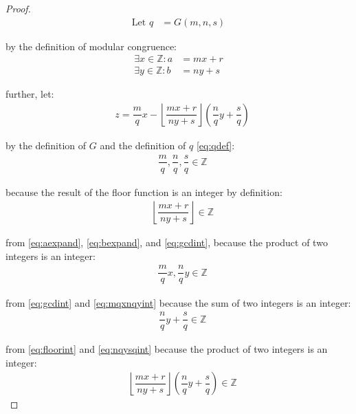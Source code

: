 \documentclass{article}
\begin{document}
\begin{proof}
\begin{align}
  \text{Let } {q} &= G\left({m}, {n}, {s}\right) \label{eq:qdef}
\end{align}

by the definition of modular congruence:
\begin{align}
  \exists {x} \in \mathbb{Z} : {a} &= {m}{x} + {r} \label{eq:aexpand} \\
  \exists {y} \in \mathbb{Z} : {b} &= {n}{y} + {s} \label{eq:bexpand}
\end{align}

further, let:
\begin{align}
  &{z} = \dfrac{{m}}{{q}}{x} - \left\lfloor\dfrac{{m}{x} + {r}}{{n}{y} + {s}}\right\rfloor\left(\dfrac{{n}}{{q}}{y} + \dfrac{{s}}{{q}}\right)
\end{align}

by the definition of $G$ and the definition of $q$ \eqref{eq:qdef}:
\begin{align}
  &\dfrac{{m}}{{q}}, \dfrac{{n}}{{q}}, \dfrac{{s}}{{q}} \in \mathbb{Z} \label{eq:gcdint}
\end{align}

because the result of the floor function is an integer by definition:
\begin{align}
  &\left\lfloor\dfrac{{m}{x} + {r}}{{n}{y} + {s}}\right\rfloor \in \mathbb{Z} \label{eq:floorint}
\end{align}

from \eqref{eq:aexpand}, \eqref{eq:bexpand}, and \eqref{eq:gcdint}, because the product of two integers is an integer:
\begin{align}
  &\dfrac{{m}}{{q}}{x}, \dfrac{{n}}{{q}}{y} \in \mathbb{Z} \label{eq:mqxnqyint}
\end{align}

from \eqref{eq:gcdint} and \eqref{eq:mqxnqyint} because the sum of two integers is an integer:
\begin{align}
  &\dfrac{{n}}{{q}}{y} + \dfrac{{s}}{{q}} \in \mathbb{Z} \label{eq:nqysqint}
\end{align}

from \eqref{eq:floorint} and \eqref{eq:nqysqint} because the product of two integers is an integer:
\begin{align}
  &\left\lfloor\dfrac{{m}{x} + {r}}{{n}{y} + {s}}\right\rfloor\left(\dfrac{{n}}{{q}}{y} + \dfrac{{s}}{{q}}\right) \in \mathbb{Z} \label{eq:prodint}
\end{align}


\end{proof}
\end{document}
